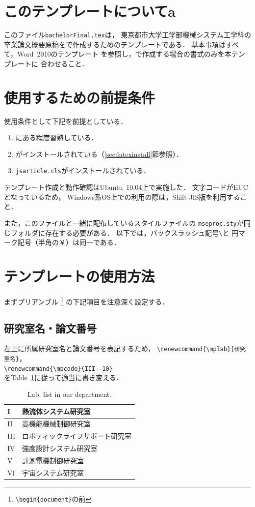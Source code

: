 \documentclass[onecolumn]{jsarticle}
\renewcommand{\mplab}{ロボティックライフサポート研究室}
\renewcommand{\mpcode}{III--10}
\begin{document}
\btitle
\section{このテンプレートについてa}
このファイル\texttt{bachelorFinal.tex}は，
東京都市大学工学部機械システム工学科の
卒業論文概要原稿を\LaTeXe で作成するためのテンプレートである．
基本事項はすべて，Word~2010のテンプレート\cite{msetemplateB}
を参照し，\LaTeXe で作成する場合の書式のみを本テンプレートに
合わせること．


\section{使用するための前提条件}
使用条件として下記を前提としている．
\begin{enumerate}
\item \LaTeXe にある程度習熟している\cite{Okumura2000}．
\item \pLaTeXe がインストールされている（\ref{sec:latexinstall}節参照）．
\item \texttt{jsarticle.cls}がインストールされている\cite{Okumura2000}．
\end{enumerate}
テンプレート作成と動作確認はUbuntu~10.04上で実施した．
文字コードがEUCとなっているため，
Windows系OS上での利用の際は，Shift-JIS版を利用すること．

また，このファイルと一緒に配布しているスタイルファイルの
\texttt{mseproc.sty}が同じフォルダに存在する必要がある．
以下では，バックスラッシュ記号\verb+\+と
円マーク記号（半角の￥）は同一である．


\section{テンプレートの使用方法}
まずプリアンブル
\footnote{\verb+\begin{document}+の前}
の下記項目を注意深く設定する．

\subsection{研究室名・論文番号}
左上に所属研究室名と論文番号を表記するため，
\verb+\renewcommand{\mplab}{研究室名}+，\\
\verb+\renewcommand{\mpcode}{III--10}+ \\
をTable~\ref{table:lablist}に従って適当に書き変える．
%
\begin{table}[ht]
  \centering
  \caption{Lab. list in our department.}
  \label{table:lablist}
  \begin{tabular}{|l|l|}\hline
    I & 熱流体システム研究室 \\ \hline 
    II & 高機能機械制御研究室 \\ \hline
    III & ロボティックライフサポート研究室 \\ \hline 
    IV & 強度設計システム研究室 \\ \hline
    V & 計測電機制御研究室 \\ \hline
    VI & 宇宙システム研究室 \\ \hline
  \end{tabular}
\end{table}
\end{document}

